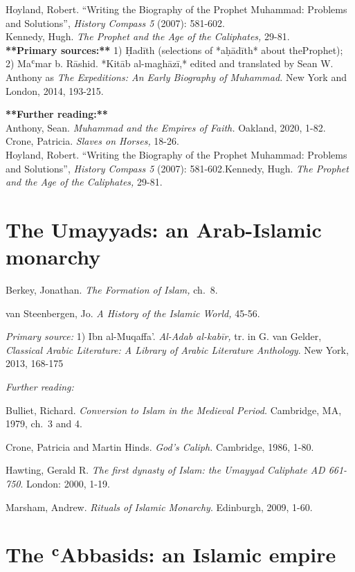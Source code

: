 \documentclass[
]{book}
\begin{document}
Hoyland, Robert. ``Writing the Biography of the Prophet Muhammad: Problems and Solutions'', \emph{History Compass 5} (2007): 581-602.\\
Kennedy, Hugh. \emph{The Prophet and the Age of the Caliphates,} 29-81.\\

\textbf{**Primary sources:**} 1) Ḥadīth (selections of *aḥādīth* about theProphet); 2) Maʿmar b. Rāshid. *Kitāb al-maghāzī,* edited and translated by Sean W. Anthony as \emph{The Expeditions: An Early Biography of Muhammad.} New York and London, 2014, 193-215.

\textbf{**Further reading:**}\\
Anthony, Sean. \emph{Muhammad and the Empires of Faith.} Oakland, 2020, 1-82.\\
Crone, Patricia. \emph{Slaves on Horses,} 18-26.\\
Hoyland, Robert. ``Writing the Biography of the Prophet Muhammad: Problems and Solutions'', \emph{History Compass 5} (2007): 581-602.Kennedy, Hugh. \emph{The Prophet and the Age of the Caliphates,} 29-81.

\hypertarget{the-umayyads-an-arab-islamic-monarchy}{%
\chapter{The Umayyads: an Arab-Islamic monarchy}\label{the-umayyads-an-arab-islamic-monarchy}}

Berkey, Jonathan. \emph{The Formation of Islam,} ch.~8.

van Steenbergen, Jo. \emph{A History of the Islamic World,} 45-56.

\emph{Primary source:} 1) Ibn al-Muqaffa'. \emph{Al-Adab al-kabīr,} tr. in G.
van Gelder, \emph{Classical Arabic Literature: A Library of Arabic Literature
Anthology}. New York, 2013, 168-175

\emph{Further reading:}

Bulliet, Richard. \emph{Conversion to Islam in the Medieval Period.}
Cambridge, MA, 1979, ch.~3 and 4.

Crone, Patricia and Martin Hinds. \emph{God's Caliph.} Cambridge, 1986, 1-80.

Hawting, Gerald R. \emph{The first dynasty of Islam: the Umayyad Caliphate AD 661-750}. London: 2000, 1-19.

Marsham, Andrew. \emph{Rituals of Islamic Monarchy}. Edinburgh, 2009, 1-60.

\hypertarget{the-ux2bfabbasids-an-islamic-empire}{%
\chapter{The ʿAbbasids: an Islamic empire}\label{the-ux2bfabbasids-an-islamic-empire}}
\end{document}

